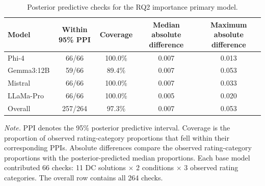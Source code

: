 \begin{table}[tbp]
\caption{Posterior predictive checks for the RQ2 importance primary model.}
\label{tab:rq2_importance_primary_ppc}
\begin{tabular}{lcccc}
\toprule
Model & Within 95\% PPI & Coverage & Median absolute difference & Maximum absolute difference \\
\midrule
Phi-4 & 66/66 & 100.0\% & 0.007 & 0.013 \\
Gemma3:12B & 59/66 & 89.4\% & 0.007 & 0.053 \\
Mistral & 66/66 & 100.0\% & 0.007 & 0.033 \\
LLaMa-Pro & 66/66 & 100.0\% & 0.005 & 0.020 \\
Overall & 257/264 & 97.3\% & 0.007 & 0.053 \\
\bottomrule
\end{tabular}
\vspace{2pt}
\begin{minipage}{\linewidth}
\footnotesize\textit{Note.} PPI denotes the 95\% posterior predictive interval. Coverage is the proportion of observed rating-category proportions that fell within their corresponding PPIs. Absolute differences compare the observed rating-category proportions with the posterior-predicted median proportions. Each base model contributed 66 checks: 11 DC solutions $\times$ 2 conditions $\times$ 3 observed rating categories. The overall row contains all 264 checks.
\end{minipage}
\end{table}
